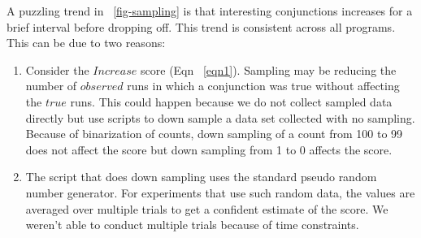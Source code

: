 A puzzling trend in ~\autoref{fig-sampling} is that interesting conjunctions increases for a brief interval before dropping off.  This trend is consistent across all programs.  This can be due to two reasons:
\begin{enumerate}
\item Consider the $Increase$ score (Eqn ~\ref{eqn1}).  Sampling may be reducing the number of $observed$ runs in which a conjunction was true without affecting the $true$ runs.  This could happen because we do not collect sampled data directly but use scripts to down sample a data set collected with no sampling.  Because of binarization of counts, down sampling of a count from 100 to 99 does not affect the score but down sampling from 1 to 0 affects the score. 
\item The script that does down sampling uses the standard pseudo random number generator.  For experiments that use such random data, the values are averaged over multiple trials to get a confident estimate of the score.  We weren't able to conduct multiple trials because of time constraints.
\end{enumerate}